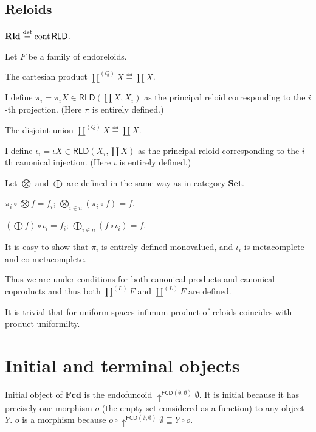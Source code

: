 \subsection{Reloids}

\begin{defn}
  $\mathbf{Rld} \overset{\mathrm{def}}{=} \operatorname{cont} \mathsf{RLD}$.
\end{defn}

Let $F$ be a family of endoreloids.

The cartesian product $\prod^{(Q)} X \eqdef \prod X$.

I define $\pi_i = \pi_i X \in \mathsf{RLD} \left( \prod X , X_i
\right)$ as the principal reloid corresponding to the $i$-th projection. (Here
$\pi$ is entirely defined.)

The disjoint union $\coprod^{(Q)} X \eqdef \coprod X$.

I define $\iota_i = \iota X \in
\mathsf{RLD} \left( X_i , \coprod X \right)$ as the principal reloid
corresponding to the $i$-th canonical injection. (Here $\iota$ is entirely
defined.)

Let $\bigotimes$ and $\bigoplus$ are defined in the same way as in category
$\mathbf{Set}$.

\begin{obvious}
$\pi_i \circ \bigotimes f = f_i$; $\bigotimes_{i \in n} (\pi_i \circ f) =
f$.
\end{obvious}

\begin{obvious}
$\left( \bigoplus f \right) \circ \iota_i = f_i$; $\bigoplus_{i \in n} (f
\circ \iota_i) = f$.
\end{obvious}

It is easy to show that $\pi_i$ is entirely defined monovalued, and $\iota_i$
is metacomplete and co-metacomplete.

Thus we are under conditions for both canonical products and canonical
coproducts and thus both $\prod^{(L)} F$ and $\coprod^{(L)} F$ are defined.

It is trivial that for uniform spaces infimum product of reloids coincides
with product uniformilty.

\section{Initial and terminal objects}

Initial object of $\mathbf{Fcd}$ is the endofuncoid
$\uparrow^{\mathsf{FCD} (\emptyset , \emptyset)} \emptyset$. It is
initial because it has precisely one morphism $o$ (the empty set considered as
a function) to any object $Y$. $o$ is a morphism because $o \circ
\uparrow^{\mathsf{FCD} (\emptyset , \emptyset)} \emptyset \sqsubseteq Y
\circ o$.

